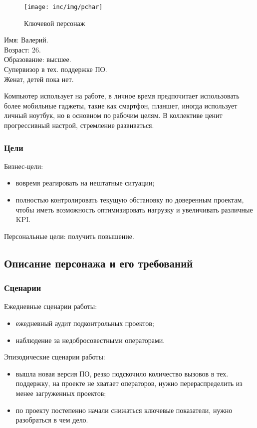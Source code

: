 \begin{figure}
    \centering
    \texttt{[image: inc/img/pchar]}
    \caption{Ключевой персонаж}
    \label{pic:pcharacter}
\end{figure}

\noindent Имя: Валерий. \\
Возраст: 26. \\
Образование: высшее. \\
Супервизор в тех. поддержке ПО. \\
Женат, детей пока нет.

Компьютер использует на работе,
в личное время предпочитает использовать более мобильные гаджеты,
такие как смартфон, планшет, иногда использует личный ноутбук,
но в основном по рабочим целям.
В коллективе ценит прогрессивный настрой, стремление развиваться.

\subsubsection{Цели}

Бизнес-цели:
\begin{itemize}
    \item вовремя реагировать на нештатные ситуации;
    \item полностью контролировать текущую обстановку по доверенным проектам, чтобы иметь возможность оптимизировать нагрузку и увеличивать различные KPI.
\end{itemize}

Персональные цели: получить повышение.

\subsection{Описание персонажа и его требований}

\subsubsection{Сценарии}

Ежедневные сценарии работы:
\begin{itemize}
    \item ежедневный аудит подконтрольных проектов;
    \item наблюдение за недобросовестными операторами.
\end{itemize}

Эпизодические сценарии работы:
\begin{itemize}
    \item вышла новая версия ПО, резко подскочило количество вызовов в тех. поддержку, на проекте не хватает операторов, нужно перераспределить из менее загруженных проектов;
    \item по проекту постепенно начали снижаться ключевые показатели, нужно разобраться в чем дело.
\end{itemize}

